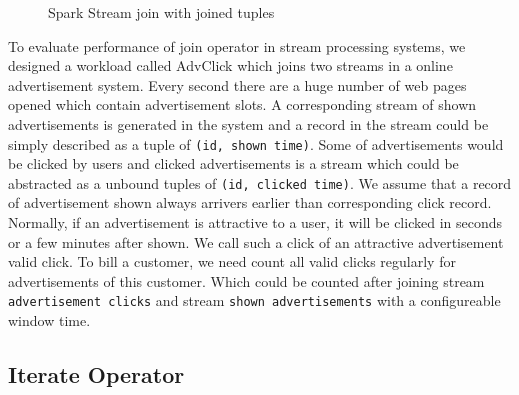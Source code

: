 \begin{figure}
  \begin{center}
   \caption{Spark Stream join with joined tuples}
   \label{fig:spark_join_repeat}
  \end{center}
\end{figure}

To evaluate performance of join operator in stream processing systems, we designed a workload called AdvClick which joins two streams in a online advertisement system. Every second there are a huge number of web pages opened which contain advertisement slots. A corresponding stream of shown advertisements is generated in the system and a record in the stream could be simply described as a tuple of \texttt{(id, shown time)}. Some of advertisements would be clicked by users and clicked advertisements is a stream which could be abstracted as a unbound tuples of \texttt{(id, clicked time)}. We assume that a record of advertisement shown always arrivers earlier than corresponding click record. Normally, if an advertisement is attractive to a user, it will be clicked in seconds or a few minutes after shown. We call such a click of an attractive advertisement valid click. To bill a customer, we need count all valid clicks regularly for advertisements of this customer. Which could be counted after joining stream \texttt{advertisement clicks} and stream \texttt{shown advertisements} with a configureable window time. 

\subsection{Iterate Operator}

